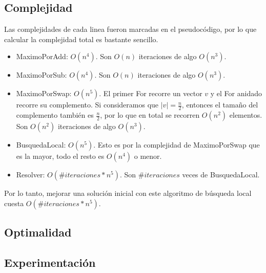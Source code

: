 \subsection{Complejidad}

Las complejidades de cada linea fueron marcadas en el pseudocódigo, por lo que calcular la complejidad total es bastante sencillo.

\begin{itemize}
    \item MaximoPorAdd: $O(n^4)$. Son $O(n)$ iteraciones de algo $O(n^3)$.
    \item MaximoPorSub: $O(n^4)$. Son $O(n)$ iteraciones de algo $O(n^3)$.
    \item MaximoPorSwap: $O(n^5)$. El primer For recorre un vector $v$ y el For anidado recorre su complemento. Si consideramos que $|v| = \frac{n}{2}$, entonces el tamaño del complemento también es $\frac{n}{2}$, por lo que en total se recorren $O(n^2)$ elementos. Son $O(n^2)$ iteraciones de algo $O(n^3)$.
    \item BusquedaLocal: $O(n^5)$. Esto es por la complejidad de MaximoPorSwap que es la mayor, todo el resto es $O(n^4)$ o menor.
    \item Resolver: $O(\#iteraciones * n^5)$. Son $\#iteraciones$ veces de BusquedaLocal.
\end{itemize}

Por lo tanto, mejorar una solución inicial con este algoritmo de búsqueda local cuesta $O(\#iteraciones * n^5)$.

\subsection{Optimalidad}

\subsection{Experimentación}
